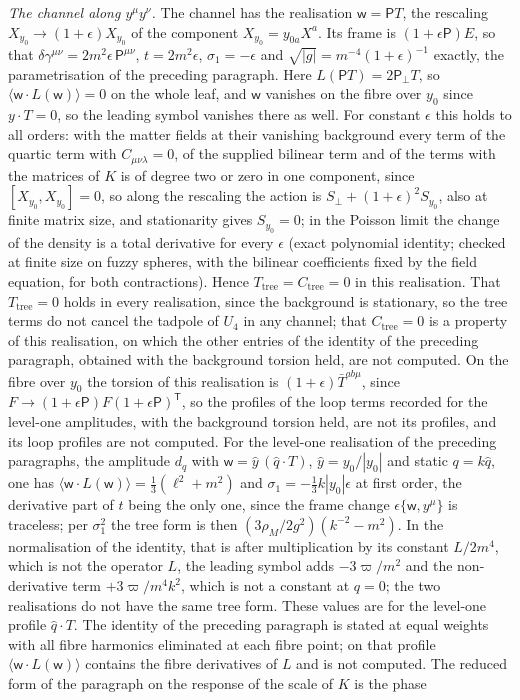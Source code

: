 \emph{The channel along \(y^\mu y^\nu\).} The channel has the realisation \(\mathsf w=\mathsf PT\), the rescaling \(X_{y_0}\to(1+\epsilon)X_{y_0}\) of the component \(X_{y_0}=y_{0a}X^a\). Its frame is \((1+\epsilon\mathsf P)E\), so that \(\delta\gamma^{\mu\nu}=2m^2\epsilon\,\mathsf P^{\mu\nu}\), \(t=2m^2\epsilon\), \(\sigma_1=-\epsilon\) and \(\sqrt{|g|}=m^{-4}(1+\epsilon)^{-1}\) exactly, the parametrisation of the preceding paragraph. Here \(L(\mathsf PT)=2\mathsf P_\perp T\), so \(\langle\mathsf w\cdot L(\mathsf w)\rangle=0\) on the whole leaf, and \(\mathsf w\) vanishes on the fibre over \(y_0\) since \(y\cdot T=0\), so the leading symbol vanishes there as well. For constant \(\epsilon\) this holds to all orders: with the matter fields at their vanishing background every term of the quartic term with \(C_{\mu\nu\lambda}=0\), of the supplied bilinear term and of the terms with the matrices of \(K\) is of degree two or zero in one component, since \([X_{y_0},X_{y_0}]=0\), so along the rescaling the action is \(S_\perp+(1+\epsilon)^2S_{y_0}\), also at finite matrix size, and stationarity gives \(S_{y_0}=0\); in the Poisson limit the change of the density is a total derivative for every \(\epsilon\) (exact polynomial identity; checked at finite size on fuzzy spheres, with the bilinear coefficients fixed by the field equation, for both contractions). Hence \(T_{\mathrm{tree}}=C_{\mathrm{tree}}=0\) in this realisation. That \(T_{\mathrm{tree}}=0\) holds in every realisation, since the background is stationary, so the tree terms do not cancel the tadpole of \(U_4\) in any channel; that \(C_{\mathrm{tree}}=0\) is a property of this realisation, on which the other entries of the identity of the preceding paragraph, obtained with the background torsion held, are not computed. On the fibre over \(y_0\) the torsion of this realisation is \((1+\epsilon)\bar T^{ab\mu}\), since \(F\to(1+\epsilon\mathsf P)F(1+\epsilon\mathsf P)^{\mathsf T}\), so the profiles of the loop terms recorded for the level-one amplitudes, with the background torsion held, are not its profiles, and its loop profiles are not computed. For the level-one realisation of the preceding paragraphs, the amplitude \(d_q\) with \(\mathsf w=\hat y\,(\hat q\cdot T)\), \(\hat y=y_0/|y_0|\) and static \(q=k\hat q\), one has \(\langle\mathsf w\cdot L(\mathsf w)\rangle=\tfrac13(\ell^2+m^2)\) and \(\sigma_1=-\tfrac13k|y_0|\epsilon\) at first order, the derivative part of \(t\) being the only one, since the frame change \(\epsilon\{\mathsf w,y^\mu\}\) is traceless; per \(\sigma_1^2\) the tree form is then \((3\rho_M/2g^2)(k^{-2}-m^2)\). In the normalisation of the identity, that is after multiplication by its constant \(L/2m^4\), which is not the operator \(L\), the leading symbol adds \(-3\varpi/m^2\) and the non-derivative term \(+3\varpi/m^4k^2\), which is not a constant at \(q=0\); the two realisations do not have the same tree form. These values are for the level-one profile \(\hat q\cdot T\). The identity of the preceding paragraph is stated at equal weights with all fibre harmonics eliminated at each fibre point; on that profile \(\langle\mathsf w\cdot L(\mathsf w)\rangle\) contains the fibre derivatives of \(L\) and is not computed. The reduced form of the paragraph on the response of the scale of \(K\) is the phase 